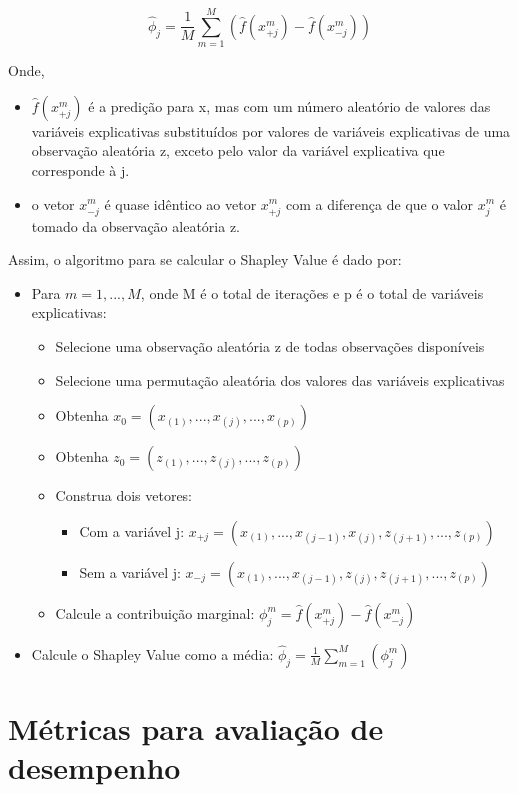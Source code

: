 \begin{equation}
\hat{\phi}_j = \frac{1}{M} \sum^{M}_{m=1}(\hat{f}(x^m_{+j}) - \hat{f}(x^m_{-j}))
\end{equation}

Onde,

\begin{itemize}
	\item $ \hat{f}(x^m_{+j}) $ é a predição para x, mas com um número aleatório de valores das variáveis explicativas substituídos por valores de variáveis explicativas de uma observação aleatória z, exceto pelo valor da variável explicativa que corresponde à j.
	\item o vetor $ x^m_{-j} $ é quase idêntico ao vetor $ x^m_{+j} $ com a diferença de que o valor $ x^m_j $ é tomado da observação aleatória z.
\end{itemize}

Assim, o algoritmo para se calcular o Shapley Value é dado por:

\begin{itemize}
	\item Para $ m=1,...,M $, onde M é o total de iterações e p é o total de variáveis explicativas:
	\begin{itemize}
		\item Selecione uma observação aleatória z de todas observações disponíveis
		\item Selecione uma permutação aleatória dos valores das variáveis explicativas
		\item Obtenha $ x_0 = (x_{(1)},...,x_{(j)},...,x_{(p)}) $
		\item Obtenha $ z_0 = (z_{(1)},...,z_{(j)},...,z_{(p)}) $
		\item Construa dois vetores:
		\begin{itemize}
			\item Com a variável j: $ x_{+j} = (x_{(1)},...,x_{(j-1)},x_{(j)},z_{(j+1)},...,z_{(p)}) $
			\item Sem a variável j: $ x_{-j} = (x_{(1)},...,x_{(j-1)},z_{(j)},z_{(j+1)},...,z_{(p)}) $
		\end{itemize}
		\item Calcule a contribuição marginal: $ \phi_j^m = \hat{f}(x^m_{+j}) - \hat{f}(x^m_{-j}) $
	\end{itemize}
	\item Calcule o Shapley Value como a média: $ \hat{\phi}_j = \frac{1}{M} \sum^{M}_{m=1}(\phi_j^m) $
\end{itemize}

\section{Métricas para avaliação de desempenho}
\label{sec:metricas_avaliacao}

